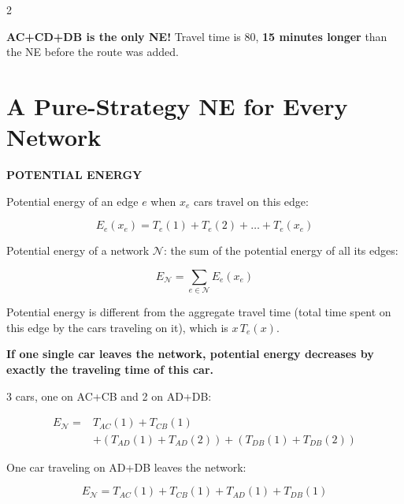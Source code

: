 \documentclass[a4paper,9pt]{extarticle}
\begin{document}
\begin{multicols}{2}
\begin{important}
\textbf{AC+CD+DB is the only NE!} Travel time is 80, \textbf{15 minutes longer} than the NE
before the route was added.

\end{important}



\section{A Pure-Strategy NE for Every Network}


\begin{definition}

\textbf{POTENTIAL ENERGY}

Potential energy of an edge $e$ when $x_e$ cars travel on this edge:

\[
E_e(x_e) = T_e(1) + T_e(2) + \dots + T_e(x_e)
\]

Potential energy of a network $\mathcal{N}$: the sum of the potential energy of all its
edges:

\[
E_{\mathcal{N}} = \sum_{e \in \mathcal{N}} E_e(x_e)
\]

\end{definition}


\begin{warning}

Potential energy is different from the aggregate travel time (total time spent on this edge
by the cars traveling on it), which is $x\,T_e(x)$.

\end{warning}


\begin{important}

\textbf{If one single car leaves the network, potential energy decreases by exactly the
traveling time of this car.}

\end{important}


\begin{example}

3 cars, one on AC+CB and 2 on AD+DB:

\begin{align*}
E_{\mathcal{N}} ={}& T_{AC}(1) + T_{CB}(1) \\
&+ (T_{AD}(1) + T_{AD}(2)) + (T_{DB}(1) + T_{DB}(2))
\end{align*}

One car traveling on AD+DB leaves the network:

\[
E_{\mathcal{N}} = T_{AC}(1) + T_{CB}(1) + T_{AD}(1) + T_{DB}(1)
\]


\end{example}
\end{multicols}
\end{document}
